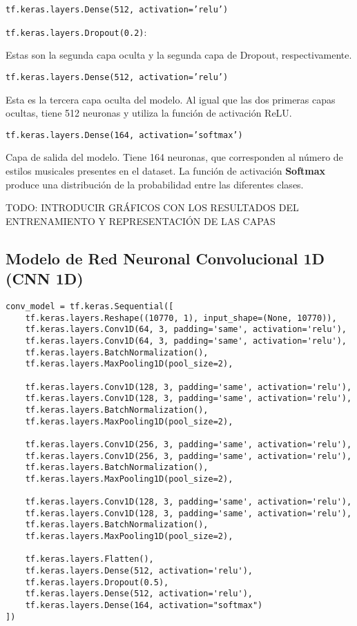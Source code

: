 \texttt{tf.keras.layers.Dense(512, activation='relu')} 

\texttt{tf.keras.layers.Dropout(0.2)}:

Estas son la segunda capa oculta y la segunda capa de Dropout, respectivamente.

\texttt{tf.keras.layers.Dense(512, activation='relu')}

Esta es la tercera capa oculta del modelo. Al igual que las dos primeras capas ocultas, tiene 512 neuronas y utiliza la función de activación ReLU.

\texttt{tf.keras.layers.Dense(164, activation='softmax')}

Capa de salida del modelo. Tiene 164 neuronas, que corresponden al número de estilos musicales presentes en el dataset. La función de activación \textbf{Softmax} produce una distribución de la probabilidad entre las diferentes clases.

TODO: INTRODUCIR GRÁFICOS CON LOS RESULTADOS DEL ENTRENAMIENTO Y REPRESENTACIÓN DE LAS CAPAS

\newpage

\subsection{Modelo de Red Neuronal Convolucional 1D (CNN 1D)}

\begin{verbatim}
conv_model = tf.keras.Sequential([
    tf.keras.layers.Reshape((10770, 1), input_shape=(None, 10770)),
    tf.keras.layers.Conv1D(64, 3, padding='same', activation='relu'),
    tf.keras.layers.Conv1D(64, 3, padding='same', activation='relu'),
    tf.keras.layers.BatchNormalization(),
    tf.keras.layers.MaxPooling1D(pool_size=2),

    tf.keras.layers.Conv1D(128, 3, padding='same', activation='relu'),
    tf.keras.layers.Conv1D(128, 3, padding='same', activation='relu'),
    tf.keras.layers.BatchNormalization(),
    tf.keras.layers.MaxPooling1D(pool_size=2),

    tf.keras.layers.Conv1D(256, 3, padding='same', activation='relu'),
    tf.keras.layers.Conv1D(256, 3, padding='same', activation='relu'),
    tf.keras.layers.BatchNormalization(),
    tf.keras.layers.MaxPooling1D(pool_size=2),

    tf.keras.layers.Conv1D(128, 3, padding='same', activation='relu'),
    tf.keras.layers.Conv1D(128, 3, padding='same', activation='relu'),
    tf.keras.layers.BatchNormalization(),
    tf.keras.layers.MaxPooling1D(pool_size=2),

    tf.keras.layers.Flatten(),
    tf.keras.layers.Dense(512, activation='relu'),
    tf.keras.layers.Dropout(0.5),
    tf.keras.layers.Dense(512, activation='relu'),
    tf.keras.layers.Dense(164, activation="softmax")
])
\end{verbatim}

